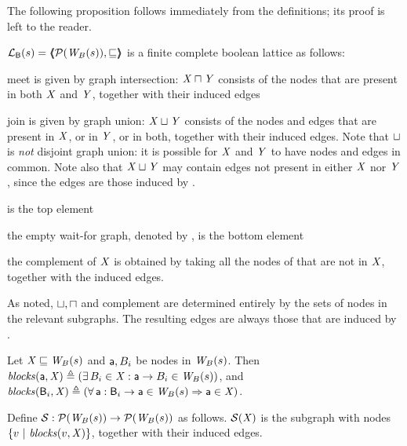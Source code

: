 The following proposition follows immediately from the definitions; its proof is left to the reader.
\begin{proposition} \label{prop:isALattice}
$\mathcal{L}_{\mathsf{B}}({s}) = \langle \hspace{-0.34em} \langle \hspace{-0.34em} \langle  \mathcal{P}(\mathit{W}_{B}({s})), \sqsubseteq  \rangle \hspace{-0.34em} \rangle \hspace{-0.34em} \rangle$ is a finite complete boolean lattice as follows:
\be

\item meet is given by graph intersection: 
$\mathit{X} \sqcap \mathit{Y}$ consists of the nodes that are present in both $\mathit{X}$ and $\mathit{Y}$, together with their induced edges

\item join is given by graph union: $\mathit{X} \sqcup \mathit{Y}$ consists of the nodes and edges that are present in $\mathit{X}$, or in $\mathit{Y}$, or in both, together with their
  induced edges.
 Note that $\sqcup$ is \emph{not} disjoint graph union: 
it is possible for $\mathit{X}$ and $\mathit{Y}$ to have nodes and edges in common. Note also that $\mathit{X} \sqcup \mathit{Y}$ may contain edges not present in either $\mathit{X}$ nor $\mathit{Y}$,
since the edges are those induced by  . 

\item {}  is the top element 

\item  the empty wait-for graph, denoted by \ewfg, is the bottom element

\item the complement \compl{\XS} of $\mathit{X}$ is obtained by taking all the nodes of  that are not in $\mathit{X}$, together with the induced edges.
\ee
\end{proposition}
%
As noted, $\sqcup, \sqcap$ and complement are determined entirely by the sets of nodes in the relevant subgraphs. The resulting edges are always those
that are induced by .



\begin{definition} \label{defn:blocks} 
Let $\mathit{X} \sqsubseteq \mathit{W}_{B}({s})$ and $\mathsf{a}, B_i$ be nodes in $\mathit{W}_{B}({s})$. Then 
$\mathit{blocks}(\mathsf{a}, \mathit{X}) \triangleq (\exists\, B_i \in \mathit{X} : \mathsf{a} \rightarrow B_i \in \mathit{W}_{B}({s}))$, and 
$\mathit{blocks}(\mathsf{B}_i, \mathit{X}) \triangleq (\forall\, \mathsf{a} : \mathsf{B}_i \rightarrow \mathsf{a} \in \mathit{W}_{B}({s}) \Rightarrow \mathsf{a} \in \mathit{X})$.
\end{definition}

\begin{definition}[$\SFs$]  \label{defn:scFix} 
Define $\mathcal{S}: \mathcal{P}(\mathit{W}_{B}({s})) \to \mathcal{P}(\mathit{W}_{B}({s}))$ as follows.
$\mathcal{S}(\mathit{X})$ is the subgraph with nodes $\{ v ~|~ \mathit{blocks}(v, \mathit{X})  \}$, together with their induced edges.
\end{definition}

